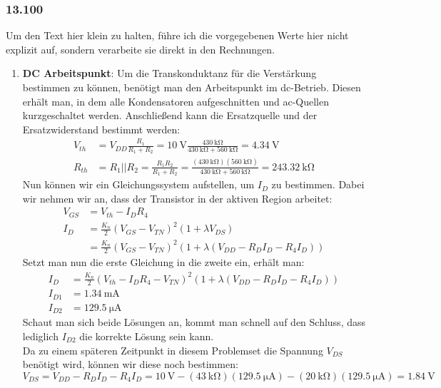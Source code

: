 \documentclass[11pt,a4paper,titlepage]{article}
\begin{document}
\subsubsection*{13.100}
Um den Text hier klein zu halten, führe ich die vorgegebenen Werte hier nicht explizit auf, sondern verarbeite sie direkt in den Rechnungen.\\
\begin{enumerate}
	\item \textbf{DC Arbeitspunkt}: Um die Transkonduktanz für die Verstärkung bestimmen zu können, benötigt man den Arbeitspunkt im dc-Betrieb. Diesen erhält man, in dem alle Kondensatoren aufgeschnitten  und ac-Quellen kurzgeschaltet werden. Anschließend kann die Ersatzquelle und der Ersatzwiderstand bestimmt werden:
	\begin{equation}
	\begin{aligned}
	  V_{th} &= V_{DD}\frac{R_1}{R_1+R_2} = \SI{10}{\volt} \frac{\SI{430}{\kilo\ohm}}{\SI{430}{\kilo\ohm} + \SI{560}{\kilo\ohm}} = \SI{4.34}{\volt}\\
	  R_{th} &= R_1 || R_2 = \frac{R_1R_2}{R_1+R_2} = \frac{(\SI{430}{\kilo\ohm})(\SI{560}{\kilo\ohm})}{\SI{430}{\kilo\ohm}+\SI{560}{\kilo\ohm}} = \SI{243.32}{\kilo\ohm}
	\end{aligned}
	\end{equation}
	Nun können wir ein Gleichungssystem aufstellen, um $I_D$ zu bestimmen. Dabei wir nehmen wir an, dass der Transistor in der aktiven Region arbeitet:
	\begin{equation}
	\begin{aligned}
	V_{GS} &= V_{th} - I_DR_4 \\
	I_D &= \frac{K_n}{2}(V_{GS}-V_{TN})^2(1+\lambda V_{DS}) \\
	    &= \frac{K_n}{2}(V_{GS}-V_{TN})^2(1+\lambda (V_{DD}-R_DI_D-R_4I_D))
	\end{aligned}
	\end{equation}
	Setzt man nun die erste Gleichung in die zweite ein, erhält man:
	\begin{equation}
	\begin{aligned}
	I_D &= \frac{K_n}{2}(V_{th} - I_DR_4-V_{TN})^2(1+\lambda (V_{DD}-R_DI_D-R_4I_D))\\
	I_{D1} &= \SI{1.34}{\milli\ampere}\\
	I_{D2} &= \SI{129.5}{\micro\ampere}
	\end{aligned}
	\end{equation}
	Schaut man sich beide Lösungen an, kommt man schnell auf den Schluss, dass lediglich $I_{D2}$ die korrekte Lösung sein kann.\\
	Da zu einem späteren Zeitpunkt in diesem Problemset die Spannung $V_{DS}$ benötigt wird, können wir diese noch bestimmen:
	\[ V_{DS} = V_{DD} - R_DI_D - R_4I_D = \SI{10}{\volt} - (\SI{43}{\kilo\ohm})(\SI{129.5}{\micro\ampere}) - (\SI{20}{\kilo\ohm})(\SI{129.5}{\micro\ampere}) = \SI{1.84}{\volt} \]
	

\end{enumerate}
\end{document}
